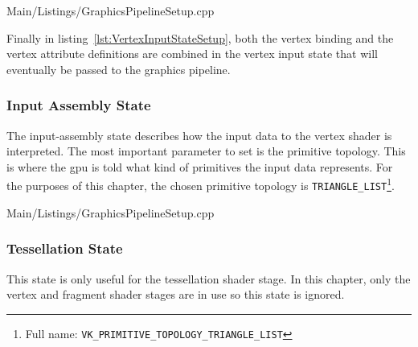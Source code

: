         
        {Main/Listings/GraphicsPipelineSetup.cpp}

        Finally in listing~\ref{lst:VertexInputStateSetup}, both the vertex binding and the vertex attribute definitions are combined in the vertex input state that will eventually be passed to the graphics pipeline.



      \subsubsection{Input Assembly State}
        The input-assembly state describes how the input data to the vertex shader is interpreted.
        The most important parameter to set is the primitive topology.
        This is where the \gls{gpu} is told what kind of primitives the input data represents.
        For the purposes of this chapter, the chosen primitive topology is \lstinline{TRIANGLE_LIST}\footnote{Full name: \lstinline{VK_PRIMITIVE_TOPOLOGY_TRIANGLE_LIST}}.

        
        {Main/Listings/GraphicsPipelineSetup.cpp}

      \subsubsection{Tessellation State}
        This state is only useful for the tessellation shader stage.
        In this chapter, only the vertex and fragment shader stages are in use so this state is ignored.

